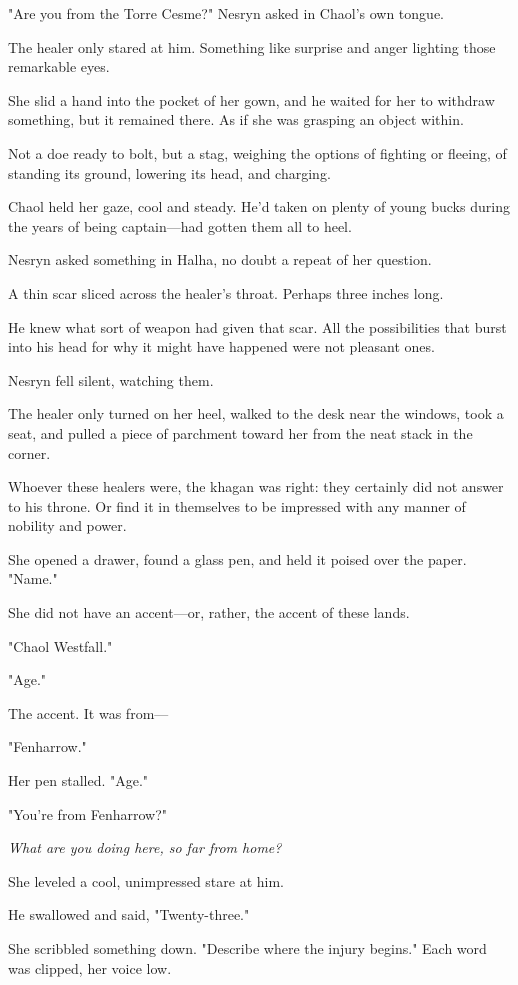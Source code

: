 "Are you from the Torre Cesme?" Nesryn asked in Chaol's own tongue.

The healer only stared at him. Something like surprise and anger lighting those remarkable eyes.

She slid a hand into the pocket of her gown, and he waited for her to withdraw something, but it remained there. As if she was grasping an object within.

Not a doe ready to bolt, but a stag, weighing the options of fighting or fleeing, of standing its ground, lowering its head, and charging.

Chaol held her gaze, cool and steady. He'd taken on plenty of young bucks during the years of being captain---had gotten them all to heel.

Nesryn asked something in Halha, no doubt a repeat of her question.

A thin scar sliced across the healer's throat. Perhaps three inches long.

He knew what sort of weapon had given that scar. All the possibilities that burst into his head for why it might have happened were not pleasant ones.

Nesryn fell silent, watching them.

The healer only turned on her heel, walked to the desk near the windows, took a seat, and pulled a piece of parchment toward her from the neat stack in the corner.

Whoever these healers were, the khagan was right: they certainly did not answer to his throne. Or find it in themselves to be impressed with any manner of nobility and power.

She opened a drawer, found a glass pen, and held it poised over the paper. "Name."

She did not have an accent---or, rather, the accent of these lands.

"Chaol Westfall."

"Age."

The accent. It was from---

"Fenharrow."

Her pen stalled. "Age."

"You're from Fenharrow?"

\emph{What are you doing here, so far from home?}

She leveled a cool, unimpressed stare at him.

He swallowed and said, "Twenty-three."

She scribbled something down. "Describe where the injury begins." Each word was clipped, her voice low.

